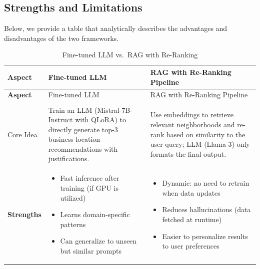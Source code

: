\subsection{Strengths and Limitations}

Below, we provide a table that analytically describes the advantages and disadvantages of the two frameworks. 


\begin{longtable}{>{\bfseries}p{} Y Y}
    \caption{Fine-tuned LLM vs.\ RAG with Re-Ranking} \\
    \label{tab:comparison_ft_rag}
    \toprule
    Aspect & Fine-tuned LLM & RAG with Re-Ranking Pipeline \\
    \midrule
    \endfirsthead
    
    \toprule
    Aspect & Fine-tuned LLM & RAG with Re-Ranking Pipeline \\
    \midrule
    \endhead
    
    \midrule
     \\
    \midrule
    \endfoot
    
    \bottomrule
    \endlastfoot
    
    Core Idea
    & Train an LLM (Mistral-7B-Instruct with QLoRA) to directly generate top-3 business location recommendations with justifications.
    & Use embeddings to retrieve relevant neighborhoods and re-rank based on similarity to the user query; LLM (Llama 3) only formats the final output. \\
    
    Strengths
    & \begin{itemize}[leftmargin=*, nosep]
        \item Fast inference after training (if GPU is utilized)
        \item Learns domain-specific patterns
        \item Can generalize to unseen but similar prompts
      \end{itemize}
    & \begin{itemize}[leftmargin=*, nosep]
        \item Dynamic: no need to retrain when data updates
        \item Reduces hallucinations (data fetched at runtime)
        \item Easier to personalize results to user preferences
      \end{itemize} \\
    

\end{longtable}
